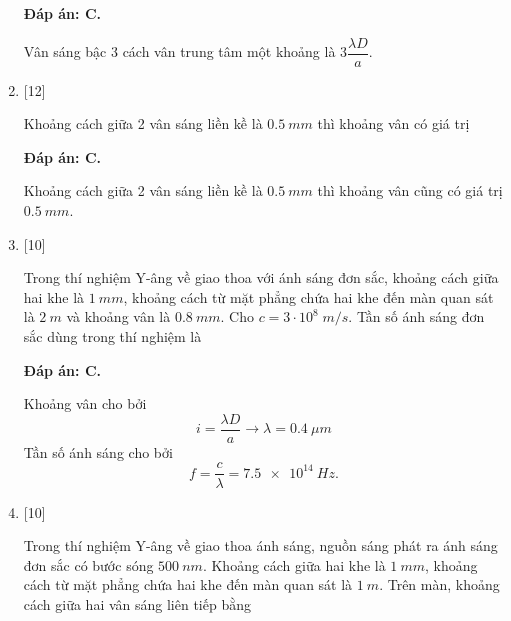 \begin{enumerate}[label=\bfseries Câu \arabic*:]
	\loigiai
	{		\textbf{Đáp án: C.}
		
		Vân sáng bậc 3 cách vân trung tâm một khoảng là $3 \dfrac{\lambda D}{a}$.	
	}
	
	\item {} [12]
	\cauhoi
	{Khoảng cách giữa 2 vân sáng liền kề là $\SI{0,5}{mm}$ thì khoảng vân có giá trị 
	}
	
	\loigiai
	{		\textbf{Đáp án: C.}
		
		Khoảng cách giữa 2 vân sáng liền kề là $\SI{0,5}{mm}$ thì khoảng vân cũng có giá trị $\SI{0,5}{mm}$.	
	}
	
	\item {} [10]
	\cauhoi
	{Trong thí nghiệm Y-âng về giao thoa với ánh sáng đơn sắc, khoảng cách giữa hai khe là $\SI{1}{mm}$, khoảng cách từ mặt phẳng chứa hai khe đến màn quan sát là $\SI{2}{m}$ và khoảng vân là $\SI{0,8}{mm}$. Cho $c = 3 \cdot 10^{8} \; \si{m/s}$. Tần số ánh sáng đơn sắc dùng trong thí nghiệm là
		
	}
	
	\loigiai
	{		\textbf{Đáp án: C.}
		
		Khoảng vân cho bởi
		$$
		i = \dfrac{\lambda D}{a}  \rightarrow \lambda = \SI{0,4}{\mu m}
		$$
		Tần số ánh sáng cho bởi
		$$
		f = \dfrac{c}{\lambda} = \SI{7,5 e14}{Hz}.
		$$
	}
	\item {} [10]
	\cauhoi
	{Trong thí nghiệm Y-âng về giao thoa ánh sáng, nguồn sáng phát ra ánh sáng đơn sắc có bước sóng $\SI{500}{nm}$. Khoảng cách giữa hai khe là $\SI{1}{mm}$, khoảng cách từ mặt phẳng chứa hai khe đến màn quan sát là $\SI{1}{m}$. Trên màn, khoảng cách giữa hai vân sáng liên tiếp bằng
	}
	

\end{enumerate}
